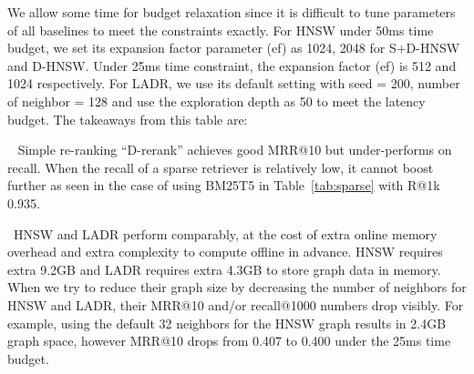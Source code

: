 We allow some time for budget relaxation since it is difficult to tune parameters of all baselines to meet the constraints exactly. 
For HNSW under 50ms time budget, we set its expansion factor parameter (ef) as 1024, 
2048 for S$+$D-HNSW and D-HNSW. 
Under 25ms time constraint, the expansion factor (ef) is  512 and  1024 respectively. 
For LADR, we use its default setting with seed = 200, number of neighbor = 128 and use the exploration depth as 50 to meet the latency budget.
The takeaways from this table are:

\textbullet\ 
Simple re-ranking ``D-rerank'' achieves good MRR@10 but under-performs on recall.
When the recall of a sparse retriever is relatively low, it cannot boost further as seen in the case of using BM25T5 in Table~\ref{tab:sparse} with R@1k 0.935.

\textbullet\ HNSW and LADR perform comparably, at the cost of extra online memory overhead  and extra complexity to compute offline in advance.
HNSW requires extra 9.2GB and LADR requires extra 4.3GB to store graph data in memory. 
When we  try to reduce their graph size by decreasing  the number of neighbors for HNSW and LADR, their  MRR@10 and/or  recall@1000 numbers drop visibly. For example, 
using the default 32 neighbors for the HNSW graph results in 2.4GB graph space, however  MRR@10 drops from 0.407 to 0.400 under the 25ms time budget. 

